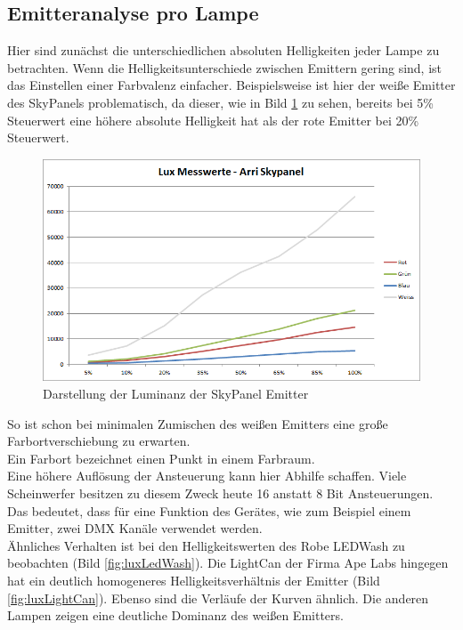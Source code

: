 \documentclass[11pt]{scrartcl}
\begin{document}
\subsection{Emitteranalyse pro Lampe} \label{emitterColorDrit}
Hier sind zunächst die unterschiedlichen absoluten Helligkeiten jeder Lampe zu betrachten. Wenn die Helligkeitsunterschiede zwischen Emittern gering sind, ist
das Einstellen einer Farbvalenz einfacher. Beispielsweise ist hier der weiße Emitter des SkyPanels problematisch, da dieser, wie in Bild \ref{fig:luxSkypanel} 
zu sehen, bereits bei 5\% Steuerwert eine höhere absolute Helligkeit hat als der rote Emitter bei 20\% Steuerwert.
\begin{figure}[H]
    \begin{center}
        \includegraphics[width=.88\textwidth]{images/charts/skypanel.png}
    \end{center}
    \vspace{-.4cm}
    \caption{Darstellung der Luminanz der SkyPanel Emitter} \label{fig:luxSkypanel}
\end{figure}
\noindent
So ist schon bei minimalen Zumischen des weißen Emitters eine große Farbortverschiebung zu erwarten.\\
Ein Farbort bezeichnet einen Punkt in einem Farbraum.\\
Eine höhere Auflösung der Ansteuerung kann hier Abhilfe schaffen. Viele Scheinwerfer besitzen zu diesem Zweck heute 16 anstatt 8 Bit Ansteuerungen. Das bedeutet,
dass für eine Funktion des Gerätes, wie zum Beispiel einem Emitter, zwei DMX Kanäle verwendet werden.\\
Ähnliches Verhalten ist bei den Helligkeitswerten des Robe LEDWash zu beobachten (Bild \ref{fig:luxLedWash}). Die LightCan der Firma Ape Labs hingegen hat ein
deutlich homogeneres Helligkeitsverhältnis der Emitter (Bild \ref{fig:luxLightCan}). Ebenso sind die Verläufe der Kurven ähnlich. Die anderen Lampen zeigen eine
deutliche Dominanz des weißen Emitters.
\end{document}
